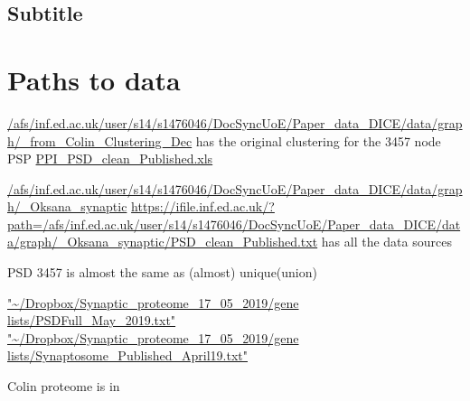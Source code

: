 \subsection*{Subtitle}
\section{Paths to data}

\url{/afs/inf.ed.ac.uk/user/s14/s1476046/DocSyncUoE/Paper_data_DICE/data/graph/_from_Colin_Clustering_Dec} has the original clustering for the 3457 node PSP \url{PPI_PSD_clean_Published.xls}

\url{ /afs/inf.ed.ac.uk/user/s14/s1476046/DocSyncUoE/Paper_data_DICE/data/graph/_Oksana_synaptic}
\url{https://ifile.inf.ed.ac.uk/?path=/afs/inf.ed.ac.uk/user/s14/s1476046/DocSyncUoE/Paper_data_DICE/data/graph/_Oksana_synaptic/PSD_clean_Published.txt} has all the data sources

PSD 3457 is almost the same as (almost) unique(union)

\url{"~/Dropbox/Synaptic_proteome_17_05_2019/gene lists/PSDFull_May_2019.txt"}
\url{"~/Dropbox/Synaptic_proteome_17_05_2019/gene lists/Synaptosome_Published_April19.txt"}

Colin proteome is in 